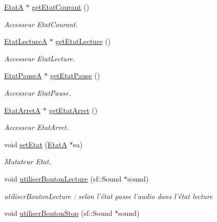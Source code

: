 \begin{DoxyCompactItemize}
\item 
\hyperlink{classEtatA}{Etat\+A} $\ast$ \hyperlink{classAudio_abc78969597e0e29936687e5bd492afa5}{get\+Etat\+Courant} ()
\begin{DoxyCompactList}\small\item\em Accesseur Etat\+Courant. \end{DoxyCompactList}\item 
\hyperlink{classEtatLectureA}{Etat\+Lecture\+A} $\ast$ \hyperlink{classAudio_a18a93b2599ee62c410a14d24616aa7ea}{get\+Etat\+Lecture} ()
\begin{DoxyCompactList}\small\item\em Accesseur Etat\+Lecture. \end{DoxyCompactList}\item 
\hyperlink{classEtatPauseA}{Etat\+Pause\+A} $\ast$ \hyperlink{classAudio_acef026681c15335e45892950223f9f32}{get\+Etat\+Pause} ()
\begin{DoxyCompactList}\small\item\em Accesseur Etat\+Pause. \end{DoxyCompactList}\item 
\hyperlink{classEtatArretA}{Etat\+Arret\+A} $\ast$ \hyperlink{classAudio_a38d8b4444ff8a9ccf04a5d97e1690718}{get\+Etat\+Arret} ()
\begin{DoxyCompactList}\small\item\em Accesseur Etat\+Arret. \end{DoxyCompactList}\item 
void \hyperlink{classAudio_a8b51ce7751d78af0f73c561940ccb3be}{set\+Etat} (\hyperlink{classEtatA}{Etat\+A} $\ast$ea)
\begin{DoxyCompactList}\small\item\em Mutateur Etat. \end{DoxyCompactList}\item 
\hypertarget{classAudio_a78fc68f0aff8192938eb49edfaa0e003}{void \hyperlink{classAudio_a78fc68f0aff8192938eb49edfaa0e003}{utiliser\+Bouton\+Lecture} (sf\+::\+Sound $\ast$sound)}\label{classAudio_a78fc68f0aff8192938eb49edfaa0e003}

\begin{DoxyCompactList}\small\item\em utiliser\+Bouton\+Lecture \+: selon l'état passe l'audio dans l'état lecture \end{DoxyCompactList}\item 
\hypertarget{classAudio_a33bb2b93eea04897c9640022a8267418}{void \hyperlink{classAudio_a33bb2b93eea04897c9640022a8267418}{utiliser\+Bouton\+Stop} (sf\+::\+Sound $\ast$sound)}\label{classAudio_a33bb2b93eea04897c9640022a8267418}


\end{DoxyCompactItemize}
